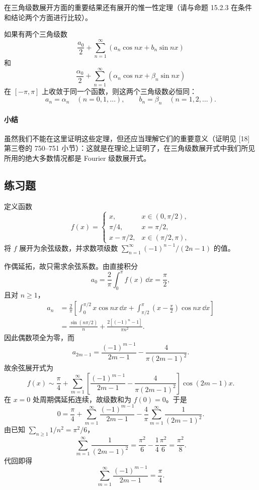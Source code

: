在三角级数展开方面的重要结果还有展开的惟一性定理（请与命题 15.2.3 在条件和结论两个方面进行比较）。

\begin{xproposition}[15.2.12（Cantor 定理）]
如果有两个三角级数
\[
  \frac{a_0}{2}+\sum_{n=1}^{\infty}(a_n\cos nx+b_n\sin nx)
\]
和
\[
  \frac{\alpha_0}{2}+\sum_{n=1}^{\infty}(\alpha_n\cos nx+\beta_n\sin nx)
\]
在 $[-\pi,\pi]$ 上收敛于同一个函数，则这两个三角级数必恒同：
\[
  a_n=\alpha_n\quad(n=0,1,\ldots),\qquad
  b_n=\beta_n\quad(n=1,2,\ldots).
\]
\end{xproposition}

\paragraph{小结}
虽然我们不能在这里证明这些定理，但还应当理解它们的重要意义（证明见 [18] 第三卷的 750--751 小节）：这就是在理论上证明了，在三角级数展开式中我们所见所用的绝大多数情况都是 Fourier 级数展开式。

\subsection{练习题}

\begin{xexercise}[1]
定义函数
  \[
    f(x)=\begin{cases}
      x,&x\in(0,\pi/2),\\
      \pi/4,&x=\pi/2,\\
      x-\pi/2,&x\in(\pi/2,\pi),
    \end{cases}
  \]
  将 $f$ 展开为余弦级数，并求数项级数 $\sum_{n=1}^{\infty}(-1)^{n-1}/(2n-1)$ 的值。
\end{xexercise}
\begin{xsolution}
作偶延拓，故只需求余弦系数。由直接积分
\[
  a_0=\frac2\pi\int_0^\pi f(x)\,\dd x=\frac\pi2,
\]
且对 $n\ge1$，
\begin{align*}
  a_n
  &=\frac2\pi\left[
    \int_0^{\pi/2}x\cos nx\,\dd x
    +\int_{\pi/2}^{\pi}\left(x-\frac\pi2\right)\cos nx\,\dd x
    \right]\\
  &=\frac{\sin(n\pi/2)}n
    +\frac{2[(-1)^n-1]}{\pi n^2}.
\end{align*}
因此偶数项全为零，而
\[
  a_{2m-1}
  =\frac{(-1)^{m-1}}{2m-1}
   -\frac4{\pi(2m-1)^2}.
\]
故余弦展开式为
\[
  f(x)\sim\frac\pi4+
  \sum_{m=1}^{\infty}
  \left[
    \frac{(-1)^{m-1}}{2m-1}
    -\frac4{\pi(2m-1)^2}
  \right]\cos(2m-1)x.
\]
在 $x=0$ 处周期偶延拓连续，故级数和为 $f(0)=0$。于是
\[
  0=\frac\pi4+\sum_{m=1}^{\infty}\frac{(-1)^{m-1}}{2m-1}
  -\frac4\pi\sum_{m=1}^{\infty}\frac1{(2m-1)^2}.
\]
由已知 $\sum_{n\ge1}1/n^2=\pi^2/6$，
\[
  \sum_{m=1}^{\infty}\frac1{(2m-1)^2}
  =\frac{\pi^2}{6}-\frac14\frac{\pi^2}{6}=\frac{\pi^2}{8}.
\]
代回即得
\[
  \boxed{\displaystyle
  \sum_{m=1}^{\infty}\frac{(-1)^{m-1}}{2m-1}=\frac\pi4 }.
\]
\end{xsolution}


